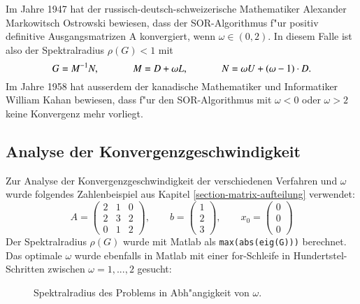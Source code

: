 \begin{refsection}
Im Jahre 1947 hat der russisch-deutsch-schweizerische Mathematiker
Alexander Markowitsch Ostrowski \cite{AlexanderMarkowitschOstrowski}
bewiesen, dass der SOR-Algorithmus f"ur positiv definitive
Ausgangsmatrizen A konvergiert, wenn $\omega \in (0,2)$. In diesem Falle
ist also der Spektralradius $\rho(G) < 1$ mit
\begin{equation} \label{Spektralradius}
G=M^{-1}N,\hspace{.1\textwidth}
M=D+\omega L,\hspace{.1\textwidth}
N=\omega U+(\omega-1)\cdot D.
\end{equation}
Im Jahre 1958 hat ausserdem der kanadische Mathematiker und Informatiker
William Kahan \cite{WilliamKahan} bewiesen, dass f"ur den SOR-Algorithmus
mit $\omega < 0$ oder $\omega > 2$ keine Konvergenz mehr vorliegt.
			
\subsection{Analyse der Konvergenzgeschwindigkeit \label{subsec:
Konv.geschw.analyse}}
Zur Analyse der Konvergenzgeschwindigkeit der verschiedenen
Verfahren und $\omega$ wurde folgendes Zahlenbeispiel aus Kapitel
\ref{section-matrix-aufteilung} verwendet:
\begin{equation} \label{G.-S.-Ex.}
A=
\begin{pmatrix}
	2 & 1 & 0 \\
	2 & 3 & 2 \\
	0 & 1 & 2
\end{pmatrix},
			\qquad
b=
\begin{pmatrix}
	1 \\
	2 \\
	3
\end{pmatrix},
\qquad
x_0=
\begin{pmatrix}
	0 \\
	0 \\
	0
\end{pmatrix}
\end{equation}
Der Spektralradius $\rho(G)$ wurde mit Matlab als
\texttt{max(abs(eig(G)))} berechnet. Das optimale $\omega$ wurde
ebenfalls in Matlab mit einer for-Schleife in Hundertstel-Schritten
zwischen $\omega=1, ..., 2$ gesucht:
\begin{figure}[!ht]\centering
\caption{Spektralradius des Problems in Abh"angigkeit von $\omega$.}
\label{fig:Spekt.rad.vs.omega}
\end{figure}


\end{refsection}
